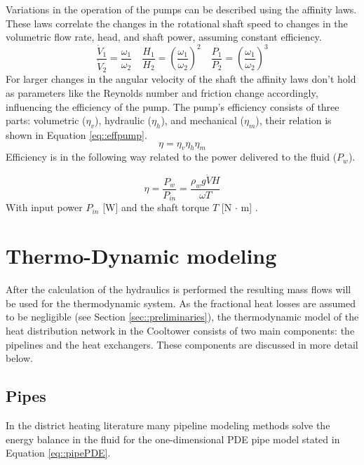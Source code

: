 Variations in the operation of the pumps can be described using the affinity laws. These laws correlate the changes in the rotational shaft speed to changes in the volumetric flow rate, head, and shaft power, assuming constant efficiency. 
\begin{equation}
\frac{\dot{V}_1}{\dot{V}_2}=\frac{\omega_1}{\omega_2} \quad \frac{H_1}{H_2}=\left(\frac{\omega_1}{\omega_2}\right)^2 \quad \frac{P_1}{P_2}=\left(\frac{\omega_1}{\omega_2}\right)^3
\end{equation}
For larger changes in the angular velocity of the shaft the affinity laws don't hold as parameters like the Reynolds number and friction change accordingly, influencing the efficiency of the pump. 
The pump's efficiency consists of three parts: volumetric ($\eta_v$), hydraulic ($\eta_h$), and mechanical ($\eta_m$), their relation is shown in Equation \ref{eq::effpump}.
\begin{equation}\label{eq::effpump}
    \eta = \eta_v\eta_h\eta_m
\end{equation}
Efficiency is in the following way related to the power delivered to the fluid ($P_w$).

\begin{equation}\label{eq::}
    \eta = \frac{P_w}{P_{in}} = \frac{\rho_w g \dot{V} H}{\omega T}
\end{equation}
With input power $P_{in}$ [W] and the shaft torque $T$ [N $\cdot$ m] \cite{white2011fluid}. 

\section{Thermo-Dynamic modeling}\label{sec::thermo}
After the calculation of the hydraulics is performed the resulting mass flows will be used for the thermodynamic system. As the fractional heat losses are assumed to be negligible (see Section \ref{sec::preliminaries}), the thermodynamic model of the heat distribution network in the Cooltower consists of two main components: the pipelines and the heat exchangers. These components are discussed in more detail below. 

\subsection{Pipes}\label{sec::thermopipes}
In the district heating literature many pipeline modeling methods solve the energy balance in the fluid for the one-dimensional PDE pipe model stated in  Equation \ref{eq::pipePDE}.

